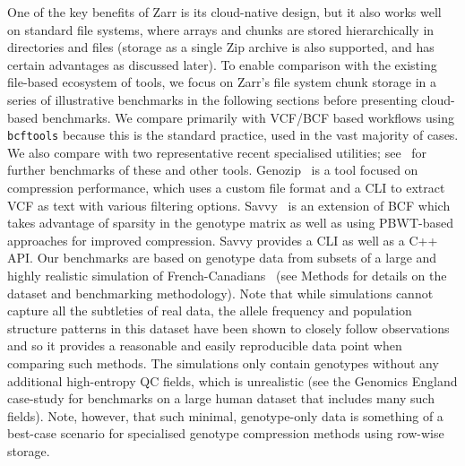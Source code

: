 \documentclass[a4paper,num-refs]{oup-contemporary}
\begin{document}
One of the key benefits of Zarr is its cloud-native design, 
but it also works well on standard file systems, where 
arrays and chunks are stored hierarchically in directories
and files (storage as a single Zip archive is also supported,
and has certain advantages as discussed later).
To enable comparison with the existing file-based ecosystem
of tools, we focus on Zarr's file system chunk storage in a series of illustrative 
benchmarks in the following sections before presenting cloud-based benchmarks. 
We compare primarily with
VCF/BCF based workflows using \texttt{bcftools} because this
is the standard practice, used in the vast majority of cases.
We also compare with two representative recent specialised utilities;
see~\cite{danek2018gtc,zhang2023gbc} for further benchmarks of 
these and other tools.
Genozip~\cite{lan2020genozip,lan2021genozip} is a tool focused 
on compression performance, which uses a custom file format 
and a CLI to extract VCF as text with various filtering options.
Savvy~\cite{lefaive2021sparse} is an extension of BCF which 
takes advantage of sparsity in the genotype matrix as well
as using PBWT-based approaches for improved compression.
Savvy provides a CLI as well as a C++ API.
Our benchmarks are based on genotype data 
from subsets of a large and highly realistic 
simulation of French-Canadians~\cite{anderson2023on}
(see Methods for details on the dataset and benchmarking methodology).
Note that while simulations cannot capture 
all the subtleties of real data, the allele frequency
and population structure patterns in this dataset 
have been shown to closely follow 
observations~\cite{anderson2023on} and so it provides 
a reasonable and easily reproducible data point 
when comparing such methods.
The simulations only contain genotypes without any additional
high-entropy QC fields, which is unrealistic 
(see the Genomics England case-study
for benchmarks on a large human dataset that includes 
many such fields). 
Note, however, that such minimal, genotype-only data 
is something of a best-case scenario for specialised genotype
compression methods using row-wise storage.
\end{document}
